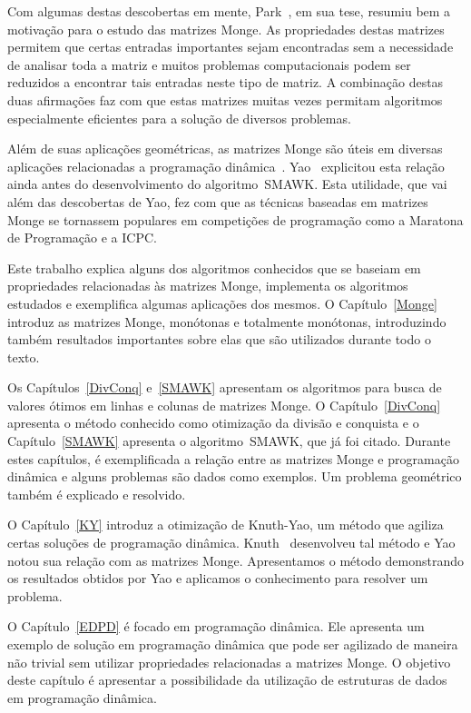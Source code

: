 Com algumas destas descobertas em mente, Park~\cite{Park:1991}, em sua tese, resumiu bem a motivação para o estudo das matrizes Monge. As propriedades destas matrizes permitem que certas entradas importantes sejam encontradas sem a necessidade de analisar toda a matriz e muitos problemas computacionais podem ser reduzidos a encontrar tais entradas neste tipo de matriz. A combinação destas duas afirmações faz com que estas matrizes muitas vezes permitam algoritmos especialmente eficientes para a solução de diversos problemas.

Além de suas aplicações geométricas, as matrizes Monge são úteis em diversas aplicações relacionadas a programação dinâmica~\cite{Bein:2009,Burkard:1996,Galil:1992}. Yao~\cite{Yao:1980,Yao:1982} explicitou esta relação ainda antes do desenvolvimento do algoritmo~\textsc{SMAWK}. Esta utilidade, que vai além das descobertas de Yao, fez com que as técnicas baseadas em matrizes Monge se tornassem populares em competições de programação como a Maratona de Programação e a ICPC.

Este trabalho explica alguns dos algoritmos conhecidos que se baseiam em propriedades relacionadas às matrizes Monge, implementa os algoritmos estudados e exemplifica algumas aplicações dos mesmos. O Capítulo~\ref{Monge} introduz as matrizes Monge, monótonas e totalmente monótonas, introduzindo também resultados importantes sobre elas que são utilizados durante todo o texto. 

Os Capítulos~\ref{DivConq} e~\ref{SMAWK} apresentam os algoritmos para busca de valores ótimos em linhas e colunas de matrizes Monge. O Capítulo~\ref{DivConq} apresenta o método conhecido como otimização da divisão e conquista e o Capítulo~\ref{SMAWK} apresenta o algoritmo~\textsc{SMAWK}, que já foi citado. Durante estes capítulos, é exemplificada a relação entre as matrizes Monge e programação dinâmica e alguns problemas são dados como exemplos. Um problema geométrico também é explicado e resolvido.

O Capítulo~\ref{KY} introduz a otimização de Knuth-Yao, um método que agiliza certas soluções de programação dinâmica. Knuth~\cite{Knuth:1971} desenvolveu tal método e Yao~\cite{Yao:1980,Yao:1982} notou sua relação com as matrizes Monge. Apresentamos o método demonstrando os resultados obtidos por Yao e aplicamos o conhecimento para resolver um problema.

O Capítulo~\ref{EDPD} é focado em programação dinâmica. Ele apresenta um exemplo de solução em programação dinâmica que pode ser agilizado de maneira não trivial sem utilizar propriedades relacionadas a matrizes Monge. O objetivo deste capítulo é apresentar a possibilidade da utilização de estruturas de dados em programação dinâmica. 

